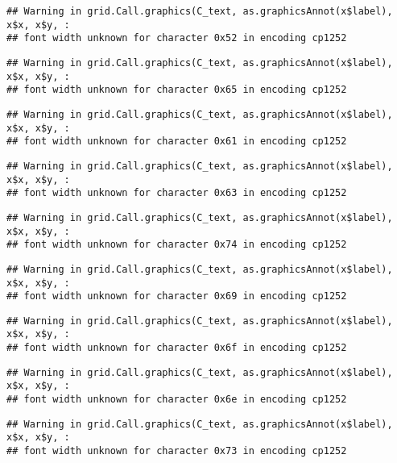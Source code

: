 \documentclass[
]{article}
\begin{document}
\begin{verbatim}
## Warning in grid.Call.graphics(C_text, as.graphicsAnnot(x$label), x$x, x$y, :
## font width unknown for character 0x52 in encoding cp1252
\end{verbatim}

\begin{verbatim}
## Warning in grid.Call.graphics(C_text, as.graphicsAnnot(x$label), x$x, x$y, :
## font width unknown for character 0x65 in encoding cp1252
\end{verbatim}

\begin{verbatim}
## Warning in grid.Call.graphics(C_text, as.graphicsAnnot(x$label), x$x, x$y, :
## font width unknown for character 0x61 in encoding cp1252
\end{verbatim}

\begin{verbatim}
## Warning in grid.Call.graphics(C_text, as.graphicsAnnot(x$label), x$x, x$y, :
## font width unknown for character 0x63 in encoding cp1252
\end{verbatim}

\begin{verbatim}
## Warning in grid.Call.graphics(C_text, as.graphicsAnnot(x$label), x$x, x$y, :
## font width unknown for character 0x74 in encoding cp1252
\end{verbatim}

\begin{verbatim}
## Warning in grid.Call.graphics(C_text, as.graphicsAnnot(x$label), x$x, x$y, :
## font width unknown for character 0x69 in encoding cp1252
\end{verbatim}

\begin{verbatim}
## Warning in grid.Call.graphics(C_text, as.graphicsAnnot(x$label), x$x, x$y, :
## font width unknown for character 0x6f in encoding cp1252
\end{verbatim}

\begin{verbatim}
## Warning in grid.Call.graphics(C_text, as.graphicsAnnot(x$label), x$x, x$y, :
## font width unknown for character 0x6e in encoding cp1252
\end{verbatim}

\begin{verbatim}
## Warning in grid.Call.graphics(C_text, as.graphicsAnnot(x$label), x$x, x$y, :
## font width unknown for character 0x73 in encoding cp1252
\end{verbatim}
\end{document}
